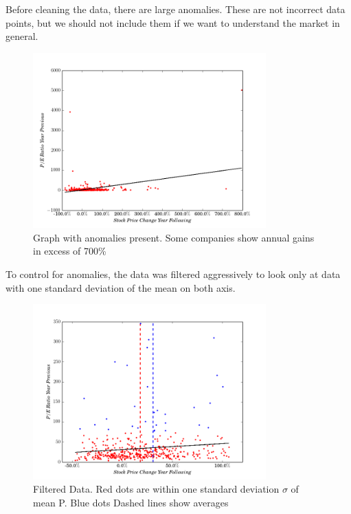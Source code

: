 \documentclass{report}
\begin{document}
Before cleaning the data, there are large anomalies. These are not incorrect data points, but we should not include them if we want to understand the market in general.

\begin{figure}[bp!]
\caption{Graph with anomalies present. Some companies show annual gains in excess of 700\%}
\centerline{\includegraphics[width=0.8\textwidth]{../work/fundamentals/absolute_pe_ratio_returns_unclean.png}}
\end{figure}

To control for anomalies, the data was filtered aggressively to look only at data with one standard deviation of the mean on both axis.

\begin{figure}[bp!]
\caption{Filtered Data. Red dots are within one standard deviation $\sigma $ of mean P. Blue dots Dashed lines show averages}
\centerline{\includegraphics[width=0.8\textwidth]{../work/fundamentals/absolute_pe_ratio_returns_clean.png}}
\end{figure}
\end{document}
